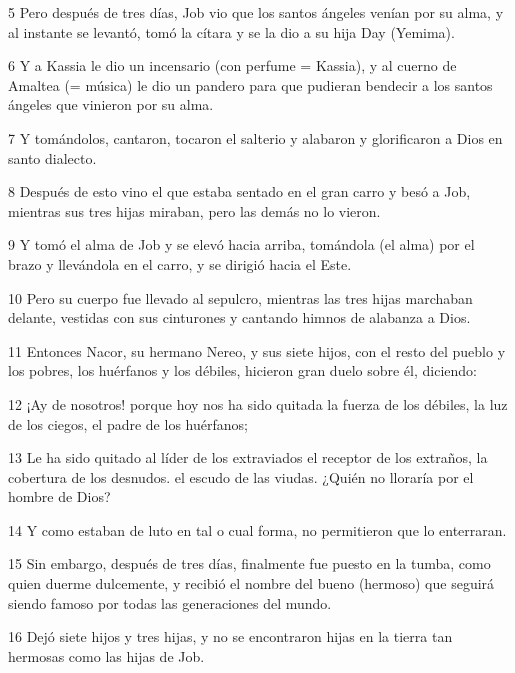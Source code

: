 \par 5 Pero después de tres días, Job vio que los santos ángeles venían por su alma, y ​​al instante se levantó, tomó la cítara y se la dio a su hija Day (Yemima).

\par 6 Y a Kassia le dio un incensario (con perfume = Kassia), y al cuerno de Amaltea (= música) le dio un pandero para que pudieran bendecir a los santos ángeles que vinieron por su alma.

\par 7 Y tomándolos, cantaron, tocaron el salterio y alabaron y glorificaron a Dios en santo dialecto.

\par 8 Después de esto vino el que estaba sentado en el gran carro y besó a Job, mientras sus tres hijas miraban, pero las demás no lo vieron.

\par 9 Y tomó el alma de Job y se elevó hacia arriba, tomándola (el alma) por el brazo y llevándola en el carro, y se dirigió hacia el Este.

\par 10 Pero su cuerpo fue llevado al sepulcro, mientras las tres hijas marchaban delante, vestidas con sus cinturones y cantando himnos de alabanza a Dios.

\par 11 Entonces Nacor, su hermano Nereo, y sus siete hijos, con el resto del pueblo y los pobres, los huérfanos y los débiles, hicieron gran duelo sobre él, diciendo:

\par 12 ¡Ay de nosotros! porque hoy nos ha sido quitada la fuerza de los débiles, la luz de los ciegos, el padre de los huérfanos;

\par 13 Le ha sido quitado al líder de los extraviados el receptor de los extraños, la cobertura de los desnudos. el escudo de las viudas. ¿Quién no lloraría por el hombre de Dios?

\par 14 Y como estaban de luto en tal o cual forma, no permitieron que lo enterraran.

\par 15 Sin embargo, después de tres días, finalmente fue puesto en la tumba, como quien duerme dulcemente, y recibió el nombre del bueno (hermoso) que seguirá siendo famoso por todas las generaciones del mundo.

\par 16 Dejó siete hijos y tres hijas, y no se encontraron hijas en la tierra tan hermosas como las hijas de Job.

